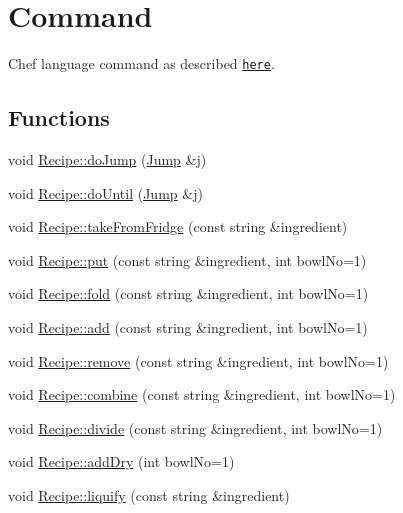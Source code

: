 \hypertarget{group__Command}{\section{Command}
\label{group__Command}
}


Chef language command as described \href{http://www.dangermouse.net/esoteric/chef.html}{\tt here}.  


\subsection*{Functions}
\begin{DoxyCompactItemize}
\item 
void \hyperlink{group__Command_ga003607cfe3ab13de0bc6b85d659856bc}{Recipe\-::do\-Jump} (\hyperlink{structJump}{Jump} \&j)
\item 
void \hyperlink{group__Command_gadad4684f1b60dbabd7ac9b8ac9816d32}{Recipe\-::do\-Until} (\hyperlink{structJump}{Jump} \&j)
\item 
void \hyperlink{group__Command_ga5119039470b26422e6ec843515d4a720}{Recipe\-::take\-From\-Fridge} (const string \&ingredient)
\item 
void \hyperlink{group__Command_ga928df02758f8f959f4beeb153ddde7d6}{Recipe\-::put} (const string \&ingredient, int bowl\-No=1)
\item 
void \hyperlink{group__Command_gaf5f825d69a4a19837a0714715710734a}{Recipe\-::fold} (const string \&ingredient, int bowl\-No=1)
\item 
void \hyperlink{group__Command_ga385cb79270fb9c857256ef79ff65010e}{Recipe\-::add} (const string \&ingredient, int bowl\-No=1)
\item 
void \hyperlink{group__Command_ga31fa0f785049498f85ab6e299217c7ab}{Recipe\-::remove} (const string \&ingredient, int bowl\-No=1)
\item 
void \hyperlink{group__Command_ga276a0e85ac154372bf1c4cdaf7304d09}{Recipe\-::combine} (const string \&ingredient, int bowl\-No=1)
\item 
void \hyperlink{group__Command_ga5d32e4fe23897d4dbb0b10eb4821baeb}{Recipe\-::divide} (const string \&ingredient, int bowl\-No=1)
\item 
void \hyperlink{group__Command_ga7c657ea9ec19dfb55292a7474fe12511}{Recipe\-::add\-Dry} (int bowl\-No=1)
\item 
void \hyperlink{group__Command_gaf44790b96aebd727ff3d7ccbbf9ff568}{Recipe\-::liquify} (const string \&ingredient)
\item 

\end{DoxyCompactItemize}
